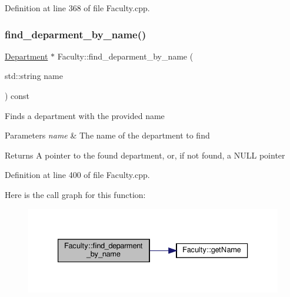 Definition at line 368 of file Faculty.\+cpp.

\mbox{\label{classFaculty_adbd64c7f09530fe481586b3d059e237f}} 
\subsubsection{\texorpdfstring{find\+\_\+deparment\+\_\+by\+\_\+name()}{find\_deparment\_by\_name()}}
{\footnotesize\ttfamily \hyperlink{classDepartment}{Department} $\ast$ Faculty\+::find\+\_\+deparment\+\_\+by\+\_\+name (\begin{DoxyParamCaption}\item[{std\+::string}]{name }\end{DoxyParamCaption}) const}

Finds a department with the provided name 
\begin{DoxyParams}{Parameters}
{\em name} & The name of the department to find \\
\hline
\end{DoxyParams}
\begin{DoxyReturn}{Returns}
A pointer to the found department, or, if not found, a N\+U\+LL pointer 
\end{DoxyReturn}


Definition at line 400 of file Faculty.\+cpp.

Here is the call graph for this function\+:\nopagebreak
\begin{figure}[H]
\begin{center}
\leavevmode
\includegraphics[width=333pt]{classFaculty_adbd64c7f09530fe481586b3d059e237f_cgraph}
\end{center}
\end{figure}
\mbox{\label{classFaculty_a02524b735865a4eb60ee0c5f681c528f}} 
